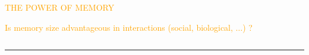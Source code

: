 \documentclass[usenames,dvipsnames,t]{beamer}
\begin{document}
\begin{columns}
    \begin{column}{.7\linewidth}
    \vspace{1.5cm}

    \centering
    \textcolor{orange}{\fontsize{110}{120} \selectfont THE POWER OF MEMORY}
    \vspace{0.7cm}

    \Large\textcolor{orange}{Is memory size advantageous in interactions (social,
    biological, $\dots$) ?}
    \end{column}
    \begin{column}{.2\linewidth}
        
        \begin{center}
            
        \end{center}
        \end{column}

    \begin{column}{.02\linewidth}
    \end{column}
\end{columns}
\vspace{1cm}

\hrule height 3pt
\vspace{1cm}
\end{document}
